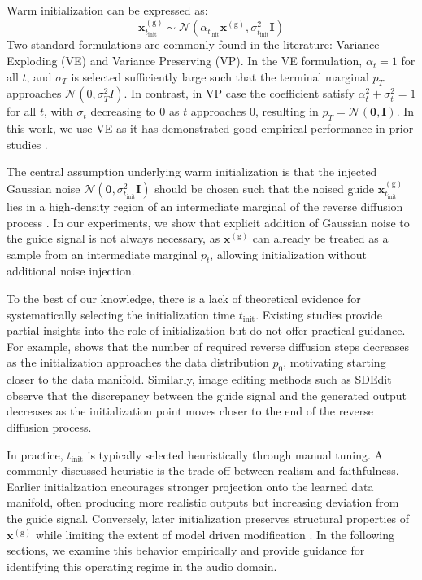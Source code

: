 Warm initialization  can be expressed as:
\begin{equation}
    \mathbf{x}^{(\mathrm g)}_{t_\text{init}} \sim \mathcal{N}(\alpha_{t_\text{init}}\mathbf{x}^{(\mathrm g)}, \sigma^2_{t_\text{init}}\mathbf{I})
    \label{eq:warm_init}
\end{equation}
Two standard formulations are commonly found in the literature: Variance Exploding (VE) and Variance Preserving (VP). In the VE formulation, $\alpha_t = 1$ for all $t$, and $\sigma_T$ is selected sufficiently large such that the terminal marginal $p_T$ approaches $\mathcal{N}(0, \sigma_T^2 I)$. In contrast, in VP case the coefficient satisfy $\alpha_t^2 + \sigma_t^2 = 1$ for all $t$, with $\sigma_t$ decreasing to 0 as $t$ approaches $0$, resulting in $p_T = \mathcal{N}(\mathbf 0, \mathbf I)$.  In this work, we use VE as it has demonstrated good empirical performance in prior studies \cite{meng2022sdeditguidedimagesynthesis}.

The central assumption underlying warm initialization is that the injected Gaussian noise $\mathcal{N}(\mathbf 0, \sigma_{t_\text{init}}^2 \mathbf I)$ should be chosen such that the noised guide $\mathbf{x}^{(\mathrm g)}_{t_\text{init}}$ lies in a high-density region of an intermediate marginal of the reverse diffusion process \cite{meng2022sdeditguidedimagesynthesis}. In our experiments, we show that explicit addition of Gaussian noise to the guide signal is not always necessary, as $\mathbf{x}^{(\mathrm g)}$ can already be treated as a sample from an intermediate marginal $p_t$, allowing initialization without additional noise injection.

To the best of our knowledge, there is a lack of theoretical evidence for systematically selecting the initialization time $t_\text{init}$. Existing studies provide partial insights into the role of initialization but do not offer practical guidance. For example, \cite{chung2022comecloserdiffusefasteracceleratingconditionaldiffusion} shows that the number of required reverse diffusion steps decreases as the initialization approaches the data distribution $p_0$, motivating starting closer to the data manifold. Similarly, image editing methods such as SDEdit \cite{meng2022sdeditguidedimagesynthesis} observe that the discrepancy between the guide signal and the generated output decreases as the initialization point moves closer to the end of the reverse diffusion process.

In practice, $t_\text{init}$ is typically selected heuristically through manual tuning. A commonly discussed heuristic is the trade off between realism and faithfulness. Earlier initialization encourages stronger projection onto the learned data manifold, often producing more realistic outputs but increasing deviation from the guide signal. Conversely, later initialization preserves structural properties of $\mathbf{x}^{(\mathrm g)}$ while limiting the extent of model driven modification \cite{meng2022sdeditguidedimagesynthesis, moliner2024buddysinglechannelblindunsupervised}. In the following sections, we examine this behavior empirically and provide guidance for identifying this operating regime in the audio domain.

